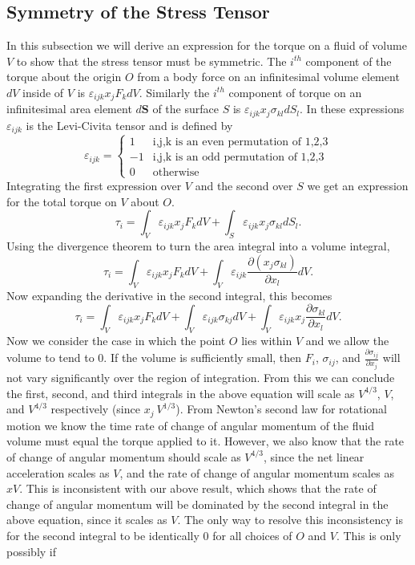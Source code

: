 \documentclass[12pt, letter]{report}
\begin{document}
\subsection{Symmetry of the Stress Tensor}
In this subsection we will derive an expression for the torque on a fluid of volume $V$ to show that the stress tensor must be symmetric. The $i^{th}$ component of the torque about the origin $O$ from a body force on an infinitesimal volume element $dV$ inside of $V$ is $\varepsilon_{ijk} x_j F_k dV$. Similarly the $i^{th}$ component of torque on an infinitesimal area element $d\textbf{S}$ of the surface $S$ is $\varepsilon_{ijk} x_j \sigma_{kl} dS_l$. In these expressions $\varepsilon_{ijk}$ is the Levi-Civita tensor and is defined by
\begin{equation}
\varepsilon_{ijk} =
\begin{cases}
1 & \text{i,j,k is an even permutation of 1,2,3} \\
-1 & \text{i,j,k is an odd permutation of 1,2,3} \\
0 & \text{otherwise}
\end{cases}
\end{equation}
Integrating the first expression over $V$ and the second over $S$ we get an expression for the total torque on $V$ about $O$.
\begin{equation}
\tau_i = \int_V \varepsilon_{ijk} x_j F_k dV + \int_S \varepsilon_{ijk} x_j \sigma_{kl} dS_l.
\end{equation}
Using the divergence theorem to turn the area integral into a volume integral,
\begin{equation}
\tau_i = \int_V \varepsilon_{ijk} x_j F_k dV + \int_V \varepsilon_{ijk} \frac{\partial (x_j \sigma_{kl})}{\partial x_l} dV.
\end{equation}
Now expanding the derivative in the second integral, this becomes
\begin{equation}
\tau_i = \int_V \varepsilon_{ijk} x_j F_k dV + \int_V \varepsilon_{ijk} \sigma_{kj} dV + \int_V \varepsilon_{ijk} x_j\frac{\partial \sigma_{kl}}{\partial x_l}dV.
\end{equation}
Now we consider the case in which the point $O$ lies within $V$ and we allow the volume to tend to $0$. If the volume is sufficiently small, then $F_i$, $\sigma_{ij}$, and $\frac{\partial \sigma_{ij}}{\partial x_j}$ will not vary significantly over the region of integration. From this we can conclude the first, second, and third integrals in the above equation will scale as $V^{4/3}$, $V$, and $V^{4/3}$ respectively (since $x_j ~ V^{1/3}$). From Newton's second law for rotational motion we know the time rate of change of angular momentum of the fluid volume must equal the torque applied to it. However, we also know that the rate of change of angular momentum should scale as $V^{4/3}$, since the net linear acceleration scales as $V$, and the rate of change of angular momentum scales as $xV$. This is inconsistent with our above result, which shows that the rate of change of angular momentum will be dominated by the second integral in the above equation, since it scales as $V$. The only way to resolve this inconsistency is for the second integral to be identically $0$ for all choices of $O$ and $V$. This is only possibly if
\end{document}
